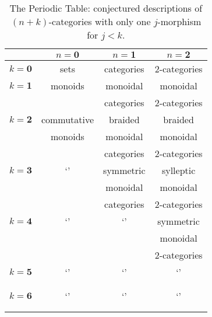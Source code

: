 \documentclass[12pt]{article}
\begin{document}
\begin{table}[h]
\begin{center}
\begin{tabular}{|c|c|c|c|}  \hline
        & $\mathbf{\mathit n = 0}$ & $\mathbf{\mathit n = 1}$ &
$\mathbf{\mathit n = 2}$\\ \hline $\mathbf{\mathit k = 0}$ & sets
& categories & 2-categories     \\     \hline
$\mathbf{\mathit k = 1}$  & monoids   & monoidal   & monoidal         \\
        &           & categories & 2-categories     \\     \hline
$\mathbf{\mathit k = 2}$  &commutative& braided    & braided          \\
        & monoids   & monoidal   & monoidal         \\
        &           & categories & 2-categories     \\     \hline
$\mathbf{\mathit k = 3}$  &`'         & symmetric  & sylleptic \\
        &           & monoidal   & monoidal         \\
        &           & categories & 2-categories     \\     \hline
$\mathbf{\mathit k = 4}$  &`'         & `'         & symmetric \\
        &           &            & monoidal         \\
        &           &            & 2-categories     \\     \hline
$\mathbf{\mathit k = 5}$  &`'         &`'          & `'               \\
        &           &            &                  \\
        &           &            &                  \\     \hline
$\mathbf{\mathit k = 6}$  &`'         &`'          & `'               \\
        &           &            &                  \\
        &           &            &                  \\     \hline
\end{tabular}
\\
\caption{The Periodic Table: conjectured descriptions of $(n+k)$-categories
with only one $j$-morphism for $j < k$.}
\label{periodic_table}
\end{center}
\end{table}
\end{document}
